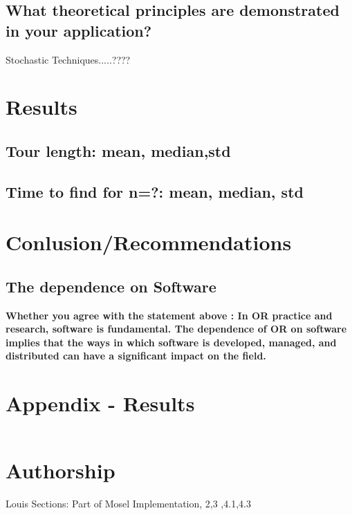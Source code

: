 \documentclass[a4paper,11pt]{article}
\begin{document}
\subsection{What theoretical principles are demonstrated in your application?}



Stochastic Techniques.....????

\section{Results}

\subsection{Tour length: mean, median,std}

\subsection{Time to find for n=?: mean, median, std}

\section{Conlusion/Recommendations}

\subsection{The dependence on Software}
\textbf{Whether you agree with the statement above : In OR practice and research, software is fundamental. The dependence
of OR on software implies that the ways in which software is developed, managed, and distributed can
have a significant impact on the field.}



























\clearpage
\section*{Appendix - Results}

\begin{lstlisting}

\end{lstlisting}

\section*{Authorship}

Louis Sections: Part of Mosel Implementation, 2,3 ,4.1,4.3



\clearpage


\end{document}
